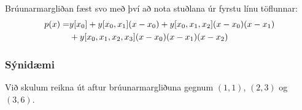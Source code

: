 \documentclass[a4paper,10pt,icelandic]{sphinxmanual}
\begin{document}
Brúunarmargliðan fæst svo með því að nota stuðlana úr fyrstu línu
töflunnar:
\begin{gather}
\begin{split}\begin{aligned}
  p(x) = &y[x_0] + y[x_0,x_1](x-x_0)
  + y[x_0,x_1,x_2](x-x_0)(x-x_1) \\
  &+ y[x_0,x_1,x_2,x_3](x-x_0)(x-x_1)(x-x_2)\end{aligned}\end{split}\notag
\end{gather}

\subsubsection{Sýnidæmi}
\label{kafli03:id2}
Við skulum reikna út aftur brúunarmargliðuna gegnum \((1,1)\),
\((2,3)\) og \((3,6)\).
\end{document}
